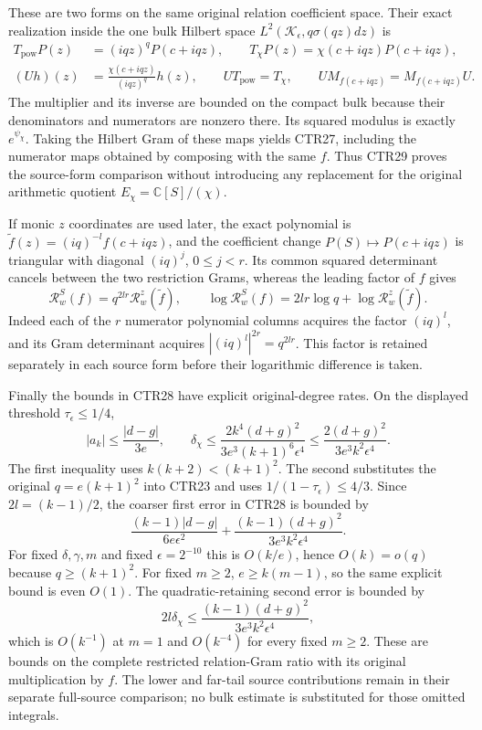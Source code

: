 These are two forms on the same original relation coefficient space.
Their exact realization inside the one bulk Hilbert space
$L^2(\mathcal K_\epsilon,q\sigma(qz)dz)$ is
\[
 \begin{split}
 T_{\mathrm{pow}}P(z)&=(iqz)^qP(c+iqz),\qquad
 T_\chi P(z)=\chi(c+iqz)P(c+iqz),\\
 (Uh)(z)&=\frac{\chi(c+iqz)}{(iqz)^q}h(z),\qquad
 UT_{\mathrm{pow}}=T_\chi,\qquad
 UM_{f(c+iqz)}=M_{f(c+iqz)}U.
 \end{split}
 \tag{CTR29}
\]
The multiplier and its inverse are bounded on the compact bulk because
their denominators and numerators are nonzero there. Its squared modulus
is exactly $e^{\psi_\chi}$. Taking the Hilbert Gram of these maps yields
CTR27, including the numerator maps obtained by composing with the same
$f$. Thus CTR29 proves the source-form comparison without introducing
any replacement for the original arithmetic quotient
$E_\chi=\mathbb C[S]/(\chi)$.

If monic $z$ coordinates are used later, the exact polynomial is
$\widetilde f(z)=(iq)^{-l}f(c+iqz)$, and the coefficient change
$P(S)\mapsto P(c+iqz)$ is triangular with diagonal $(iq)^j$,
$0\leq j<r$. Its common squared determinant cancels between the two
restriction Grams, whereas the leading factor of $f$ gives
\[
 \mathcal R_w^{S}(f)=q^{2lr}\mathcal R_w^{z}(\widetilde f),\qquad
 \log\mathcal R_w^{S}(f)=2lr\log q+\log\mathcal R_w^{z}(\widetilde f).
 \tag{CTR30}
\]
Indeed each of the $r$ numerator polynomial columns acquires the factor
$(iq)^l$, and its Gram determinant acquires $|(iq)^l|^{2r}=q^{2lr}$.
This factor is retained separately in each source form before their
logarithmic difference is taken.

Finally the bounds in CTR28 have explicit original-degree rates.
On the displayed threshold $\tau_\epsilon\leq1/4$,
\[
 |a_k|\leq\frac{|d-g|}{3e},\qquad
 \delta_\chi\leq
 \frac{2k^4(d+g)^2}{3e^3(k+1)^6\epsilon^4}
 \leq\frac{2(d+g)^2}{3e^3k^2\epsilon^4}.
 \tag{CTR31}
\]
The first inequality uses $k(k+2)<(k+1)^2$. The second substitutes the
original $q=e(k+1)^2$ into CTR23 and uses $1/(1-\tau_\epsilon)\leq4/3$.
Since $2l=(k-1)/2$, the coarser first error in CTR28 is bounded by
\[
 \frac{(k-1)|d-g|}{6e\epsilon^2}
 +\frac{(k-1)(d+g)^2}{3e^3k^2\epsilon^4}.
 \tag{CTR32}
\]
For fixed $\delta,\gamma,m$ and fixed $\epsilon=2^{-10}$ this is
$O(k/e)$, hence $O(k)=o(q)$ because $q\geq(k+1)^2$.
For fixed $m\geq2$, $e\geq k(m-1)$, so the same explicit bound is
even $O(1)$. The quadratic-retaining second error is bounded by
\[
 2l\delta_\chi\leq
 \frac{(k-1)(d+g)^2}{3e^3k^2\epsilon^4},
 \tag{CTR33}
\]
which is $O(k^{-1})$ at $m=1$ and $O(k^{-4})$ for every fixed $m\geq2$.
These are bounds on the complete restricted relation-Gram ratio with
its original multiplication by $f$. The lower and far-tail source
contributions remain in their separate full-source comparison; no
bulk estimate is substituted for those omitted integrals.

